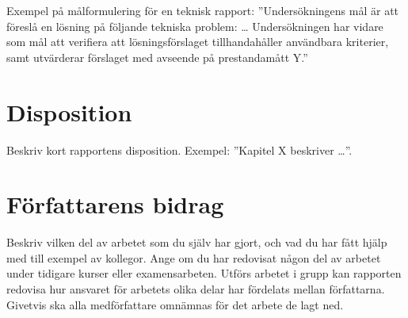 Exempel på målformulering för en teknisk rapport:
''Undersökningens mål är att föreslå en lösning på följande tekniska problem: 
\dots
Undersökningen har vidare som mål att verifiera att lösningsförslaget 
tillhandahåller användbara kriterier, samt utvärderar förslaget med avseende på 
prestandamått Y.''


\section{Disposition}
\label{ch:disposition}
\noindent
Beskriv kort rapportens disposition.
Exempel:
''Kapitel X beskriver \dots''.


\section{Författarens bidrag}
\label{ch:contrib}
\noindent
Beskriv vilken del av arbetet som du själv har gjort, och vad du har fått hjälp 
med till exempel av kollegor.
Ange om du har redovisat någon del av arbetet under tidigare kurser eller 
examensarbeten.
Utförs arbetet i grupp kan rapporten redovisa hur ansvaret för arbetets olika 
delar har fördelats mellan författarna.
Givetvis ska alla medförfattare omnämnas för det arbete de lagt ned.

